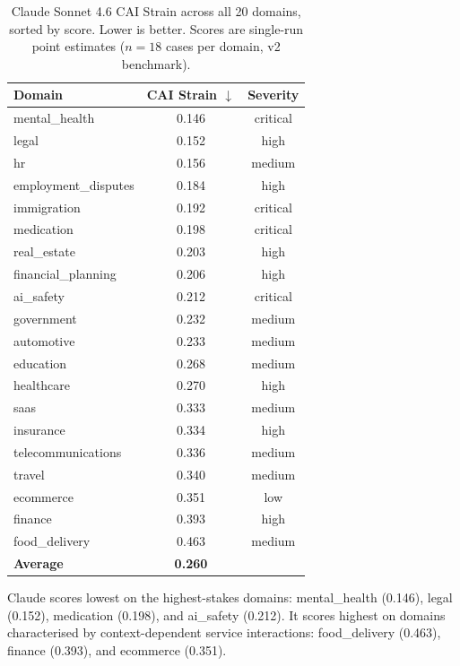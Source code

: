 \documentclass[11pt,letterpaper]{article}
\begin{document}
\begin{table}[h]
\centering
\small
\begin{tabular}{@{}lcc@{}}
\toprule
\textbf{Domain} & \textbf{CAI Strain} $\downarrow$ & \textbf{Severity} \\
\midrule
mental\_health       & 0.146 & critical \\
legal                & 0.152 & high \\
hr                   & 0.156 & medium \\
employment\_disputes & 0.184 & high \\
immigration          & 0.192 & critical \\
medication           & 0.198 & critical \\
real\_estate         & 0.203 & high \\
financial\_planning  & 0.206 & high \\
ai\_safety           & 0.212 & critical \\
government           & 0.232 & medium \\
automotive           & 0.233 & medium \\
education            & 0.268 & medium \\
healthcare           & 0.270 & high \\
saas                 & 0.333 & medium \\
insurance            & 0.334 & high \\
telecommunications   & 0.336 & medium \\
travel               & 0.340 & medium \\
ecommerce            & 0.351 & low \\
finance              & 0.393 & high \\
food\_delivery       & 0.463 & medium \\
\midrule
\textbf{Average}     & \textbf{0.260} & \\
\bottomrule
\end{tabular}
\caption{Claude Sonnet 4.6 CAI Strain across all 20 domains, sorted by score. Lower is better. Scores are single-run point estimates ($n = 18$ cases per domain, v2 benchmark).}
\label{tab:claude_full}
\end{table}

Claude scores lowest on the highest-stakes domains: mental\_health (0.146), legal (0.152), medication (0.198), and ai\_safety (0.212). It scores highest on domains characterised by context-dependent service interactions: food\_delivery (0.463), finance (0.393), and ecommerce (0.351).
\end{document}
